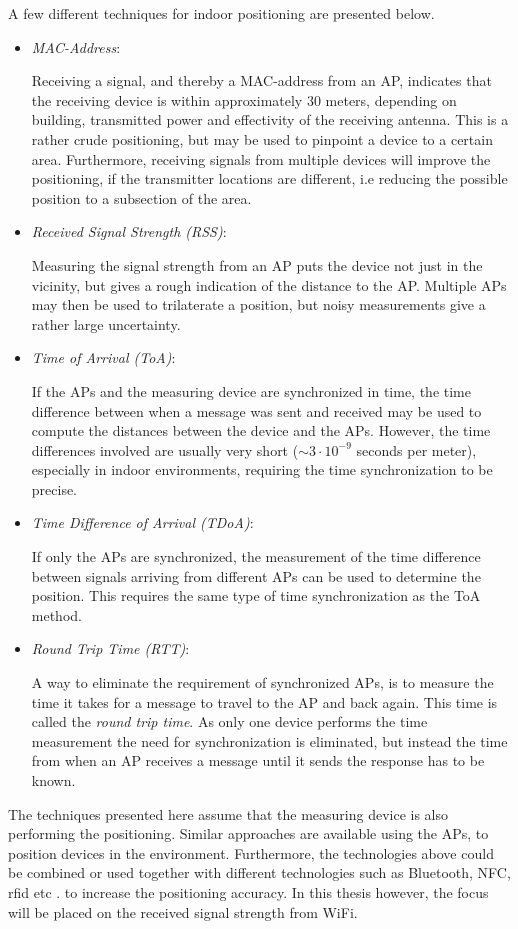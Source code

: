 \documentclass{LTHthesis}
\begin{document}
A few different techniques for indoor positioning are presented below.
%
\begin{itemize}
\item \emph{MAC-Address}:  

Receiving a signal, and thereby a MAC-address from an AP, indicates that the receiving device is within approximately $30$ meters, depending on building, transmitted power and effectivity of the receiving antenna. This is a rather crude positioning, but may be used to pinpoint a device to a certain area. Furthermore, receiving signals from multiple devices will improve the positioning, if the transmitter locations are different, i.e reducing the possible position to a subsection of the area. 
%
\item \emph{Received Signal Strength (RSS)}:

Measuring the signal strength from an AP puts the device not just in the vicinity, but gives a rough indication of the distance to the AP. Multiple APs may then be used to trilaterate a position, but noisy measurements give a rather large uncertainty. 
%
\item \emph{Time of Arrival (ToA)}:

If the APs and the measuring device are synchronized in time, the time difference between when a message was sent and received may be used to compute the distances between the device and the APs. However, the time differences involved are usually very short ($\sim 3\cdot10^{-9}$ seconds per meter), especially in indoor environments, requiring the time synchronization to be precise.  
%
\item \emph{Time Difference of Arrival (TDoA)}:

If only the APs are synchronized, the measurement of the time difference between signals arriving from different APs can be used to determine the position. This requires the same type of time synchronization as the ToA method. 

\item \emph{Round Trip Time (RTT)}: 

A way to eliminate the requirement of synchronized APs, is to measure the time it takes for a message to travel to the AP and back again. This time is called the \emph{round trip time}. As only one device performs the time measurement the need for synchronization is eliminated, but instead the time from when an AP receives a message until it sends the response has to be known.
%
\end{itemize}
%
The techniques presented here assume that the measuring device is also performing the positioning. Similar approaches are available using the APs, to position devices in the environment. Furthermore, the technologies above could be combined or used together with different technologies such as Bluetooth, NFC, rfid etc \cite{nfc, rfid}. to increase the positioning accuracy. 
In this thesis however, the focus will be placed on the received signal strength from WiFi.
%
\end{document}
